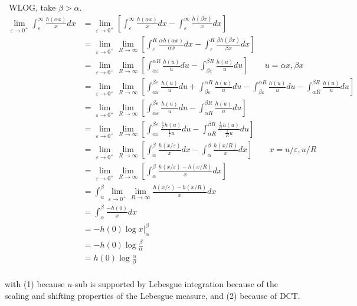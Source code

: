 \documentclass[12pt]{Homework}
\begin{document}
\begin{solution}$\,$
WLOG, take $\beta>\alpha.$
\begin{align*}
    \lim_{\varepsilon\to0^+}\int_\varepsilon^\infty\frac{h(\alpha x)}{x}dx&=\lim_{\varepsilon\to0^+}\left[\int_\varepsilon^\infty\frac{h(\alpha x)}{x}dx-\int_\varepsilon^\infty\frac{h(\beta x)}{x}dx\right]\\
    &=\lim_{\varepsilon\to0^+}\lim_{R\to\infty}\left[\int_\varepsilon^R\frac{\alpha h(\alpha x)}{\alpha x}dx-\int_\varepsilon^R\frac{\beta h(\beta x)}{\beta x}dx\right]\\
    &=\lim_{\varepsilon\to0^+}\lim_{R\to\infty}\left[\int_{\alpha\varepsilon}^{\alpha R}\frac{h(u)}{u}du-\int_{\beta\varepsilon}^{\beta R}\frac{h(u)}{u}du\right]\qquad u=\alpha x,\beta x\tag{1}\\
    &=\lim_{\varepsilon\to0^+}\lim_{R\to\infty}\left[\int_{\alpha\varepsilon}^{\beta\varepsilon}\frac{h(u)}{u}du+\int_{\beta\varepsilon}^{\alpha R}\frac{h(u)}{u}du-\int_{\beta\varepsilon}^{\alpha R}\frac{h(u)}{u}du-\int_{\alpha R}^{\beta R}\frac{h(u)}{u}du\right]\\
    &=\lim_{\varepsilon\to0^+}\lim_{R\to\infty}\left[\int_{\alpha\varepsilon}^{\beta\varepsilon}\frac{h(u)}{u}du-\int_{\alpha R}^{\beta R}\frac{h(u)}{u}du\right]\\
    &=\lim_{\varepsilon\to0^+}\lim_{R\to\infty}\left[\int_{\alpha\varepsilon}^{\beta\varepsilon}\frac{\frac{1}{\varepsilon}h(u)}{\frac{1}{\varepsilon}u}du-\int_{\alpha R}^{\beta R}\frac{\frac{1}{R}h(u)}{\frac{1}{R}u}du\right]\\
    &=\lim_{\varepsilon\to0^+}\lim_{R\to\infty}\left[\int_\alpha^\beta\frac{h(x/\varepsilon)}{x}dx-\int_\alpha^\beta\frac{h(x/R)}{x}dx\right]\qquad x=u/\varepsilon,u/R\\
    &=\lim_{\varepsilon\to0^+}\lim_{R\to\infty}\left[\int_\alpha^\beta\frac{h(x/\varepsilon)-h(x/R)}{x}dx\right]\\
    &=\int_\alpha^\beta\lim_{\varepsilon\to0^+}\lim_{R\to\infty}\frac{h(x/\varepsilon)-h(x/R)}{x}dx\tag{2}\\
     &=\int_\alpha^\beta\frac{-h(0)}{x}dx\\
     &=-h(0)\log x\big|_\alpha^\beta\\
     &=-h(0)\log\frac{\beta}{\alpha}\\
     &=h(0)\log\frac{\alpha}{\beta}\\
\end{align*}

with (1) because $u$-sub is supported by Lebesgue integration because of the scaling and shifting properties of the Lebesgue measure, and (2) because of DCT.


\end{solution}
\end{document}
